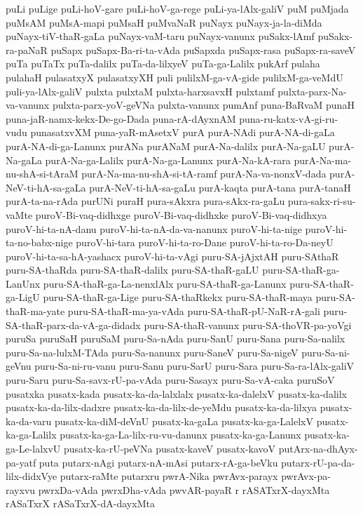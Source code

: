 {puLi
puLige
puLi-hoV-gare
puLi-hoV-ga-rege
puLi-ya-lAlx-galiV
puM
puMjada
puMsAM
puMsA-mapi
puMsaH
puMvaNaR
puNayx
puNayx-ja-la-diMda
puNayx-tiV-thaR-gaLa
puNayx-vaM-taru
puNayx-vanunx
puSakx-lAmf
puSakx-ra-paNaR
puSapx
puSapx-Ba-ri-ta-vAda
puSapxda
puSapx-rasa
puSapx-ra-saveV
puTa
puTaTx
puTa-dalilx
puTa-da-lilxyeV
puTa-ga-Lalilx
pukArf
pulaha
pulahaH
pulasatxyX
pulasatxyXH
puli
pulilxM-ga-vA-gide
pulilxM-ga-veMdU
puli-ya-lAlx-galiV
pulxta
pulxtaM
pulxta-harxsavxH
pulxtamf
pulxta-parx-Na-va-vanunx
pulxta-parx-yoV-geVNa
pulxta-vanunx
pumAnf
puna-BaRvaM
punaH
puna-jaR-namx-kekx-De-go-Dada
puna-rA-dAyxnAM
puna-ru-katx-vA-gi-ru-vudu
punasatxvXM
puna-yaR-mAsetxV
purA
purA-NAdi
purA-NA-di-gaLa
purA-NA-di-ga-Lanunx
purANa
purANaM
purA-Na-dalilx
purA-Na-gaLU
purA-Na-gaLa
purA-Na-ga-Lalilx
purA-Na-ga-Lanunx
purA-Na-kA-rara
purA-Na-ma-nu-shA-si-tAraM
purA-Na-ma-nu-shA-si-tA-ramf
purA-Na-va-nonxV-dada
purA-NeV-ti-hA-sa-gaLa
purA-NeV-ti-hA-sa-gaLu
purA-kaqta
purA-tana
purA-tanaH
purA-ta-na-rAda
purUNi
puraH
pura-sAkxra
pura-sAkx-ra-gaLu
pura-sakx-ri-su-vaMte
puroV-Bi-vaq-didhxge
puroV-Bi-vaq-didhxke
puroV-Bi-vaq-didhxya
puroV-hi-ta-nA-danu
puroV-hi-ta-nA-da-va-nanunx
puroV-hi-ta-nige
puroV-hi-ta-no-babx-nige
puroV-hi-tara
puroV-hi-ta-ro-Dane
puroV-hi-ta-ro-Da-neyU
puroV-hi-ta-sa-hA-yashacx
puroV-hi-ta-vAgi
puru-SA-jAjxtAH
puru-SAthaR
puru-SA-thaRda
puru-SA-thaR-dalilx
puru-SA-thaR-gaLU
puru-SA-thaR-ga-LanUnx
puru-SA-thaR-ga-La-nenxlAlx
puru-SA-thaR-ga-Lanunx
puru-SA-thaR-ga-LigU
puru-SA-thaR-ga-Lige
puru-SA-thaRkekx
puru-SA-thaR-maya
puru-SA-thaR-ma-yate
puru-SA-thaR-ma-ya-vAda
puru-SA-thaR-pU-NaR-rA-gali
puru-SA-thaR-parx-da-vA-ga-didadx
puru-SA-thaR-vanunx
puru-SA-thoVR-pa-yoVgi
puruSa
puruSaH
puruSaM
puru-Sa-nAda
puru-SanU
puru-Sana
puru-Sa-nalilx
puru-Sa-na-lulxM-TAda
puru-Sa-nanunx
puru-SaneV
puru-Sa-nigeV
puru-Sa-ni-geVnu
puru-Sa-ni-ru-vanu
puru-Sanu
puru-SarU
puru-Sara
puru-Sa-ra-lAlx-galiV
puru-Saru
puru-Sa-savx-rU-pa-vAda
puru-Sasayx
puru-Sa-vA-caka
puruSoV
pusatxka
pusatx-kada
pusatx-ka-da-lalxlalx
pusatx-ka-dalelxV
pusatx-ka-dalilx
pusatx-ka-da-lilx-dadxre
pusatx-ka-da-lilx-de-yeMdu
pusatx-ka-da-lilxya
pusatx-ka-da-varu
pusatx-ka-diM-deVnU
pusatx-ka-gaLa
pusatx-ka-ga-LalelxV
pusatx-ka-ga-Lalilx
pusatx-ka-ga-La-lilx-ru-vu-danunx
pusatx-ka-ga-Lanunx
pusatx-ka-ga-Le-lalxvU
pusatx-ka-rU-peVNa
pusatx-kaveV
pusatx-kavoV
putArx-na-dhAyx-pa-yatf
puta
putarx-nAgi
putarx-nA-mAsi
putarx-rA-ga-beVku
putarx-rU-pa-da-lilx-didxVye
putarx-raMte
putarxru
pwrA-Nika
pwrAvx-parayx
pwrAvx-pa-rayxvu
pwrxDa-vAda
pwrxDha-vAda
pwvAR-payaR
r
rASATxrX-dayxMta
rASaTxrX
rASaTxrX-dA-dayxMta
}
